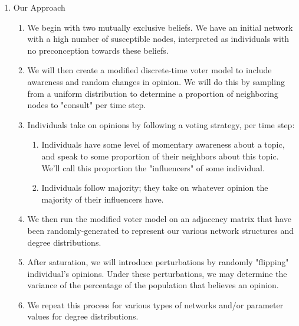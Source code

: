 \documentclass{article}
\begin{document}
\begin{enumerate}[label=\arabic*.]
\begin{enumerate}[label=\Alph*.]
        
        \end{enumerate}
    
    \item Our Approach
    
        \begin{enumerate}[label=\Alph*.]
        
        \item We begin with two mutually exclusive beliefs. We have an initial network with a high number of susceptible nodes, interpreted as individuals with no preconception towards these beliefs.
        
        \item We will then create a modified discrete-time voter model to include awareness and random changes in opinion. We will do this by sampling from a uniform distribution to determine a proportion of neighboring nodes to "consult" per time step.
        
        \item Individuals take on opinions by following a voting strategy, per time step:
            \begin{enumerate}[label=\arabic*.]
                \item Individuals have some level of momentary awareness about a topic, and speak to some proportion of their neighbors about this topic. We'll call this proportion the "influencers" of some individual.
                \item Individuals follow majority; they take on whatever opinion the majority of their influencers have.
            \end{enumerate}
        
        \item We then run the modified voter model on an adjacency matrix that have been randomly-generated to represent our various network structures and degree distributions. 
        
        \item After saturation, we will introduce perturbations by randomly "flipping" individual's opinions. Under these perturbations, we may determine the variance of the percentage of the population that believes an opinion.
        
        \item We repeat this process for various types of networks and/or parameter values for degree distributions. 
        
        \end{enumerate}
        

\end{enumerate}
\end{document}
